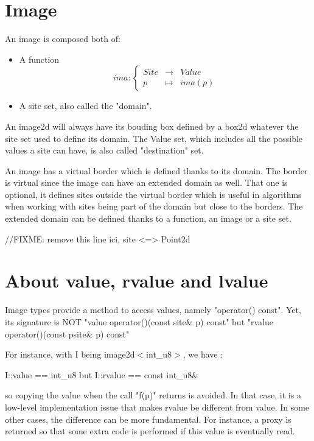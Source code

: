 \documentclass{report}
\begin{document}
\clearpage
\newpage
\section{Image}

An image is composed both of:
\begin{itemize}
\item A function $$
ima : \left\{
  \begin{array}{lll}
    Site &\rightarrow & Value \\
    p & \mapsto & ima(p)
  \end{array}
\right.
$$
\item A site set, also called the "domain".
\end{itemize}

An image2d will always have its bouding box defined by a box2d whatever the
site set used to define its domain.
The Value set, which includes all the possible values a site can have, is also
called "destination" set.

An image has a virtual border which is defined thanks to its domain. The
 border is virtual since the image can have an extended domain as well.
That one is optional, it defines sites outside the virtual border which is
useful in algorithms when working with sites being part of the domain but close
to the borders. The extended domain can be defined thanks to a function, an
image or a site set.

//FIXME: remove this line
ici, site <=> Point2d


\section{About value, rvalue and lvalue}

Image types provide a method to access values, namely "operator() const".
Yet, its signature is NOT "value operator()(const site\& p) const"
but "rvalue operator()(const psite\& p) const"

For instance, with I being image2d$<$int\_u8$>$, we have :

    I::value == int\_u8  but  I::rvalue == const int\_u8\&

so copying the value when the call "f(p)" returns is avoided.
In that case, it is a low-level implementation issue that makes rvalue
be different from value.  In some other cases, the difference can be
more fundamental.  For instance, a proxy is returned so that some extra
code is performed if this value is eventually read.
\end{document}
